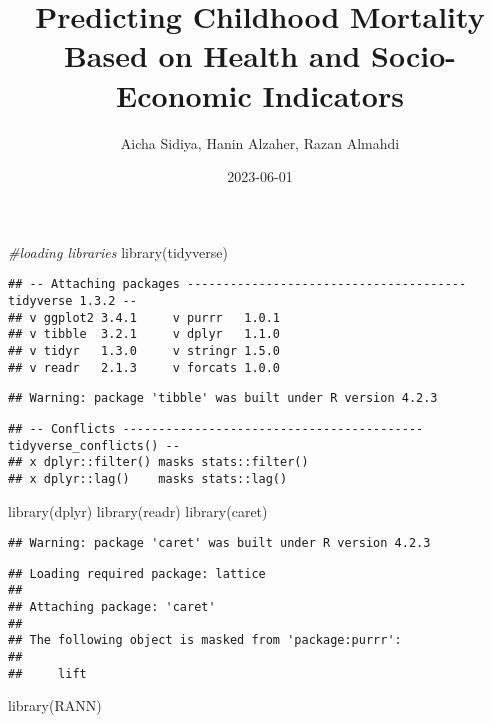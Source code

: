 \documentclass[
]{article}
\title{Predicting Childhood Mortality Based on Health and Socio-Economic
Indicators}
\author{Aicha Sidiya, Hanin Alzaher, Razan Almahdi}
\date{2023-06-01}
\newenvironment{Shaded}{\begin{snugshade}}{\end{snugshade}}
\newcommand{\CommentTok}[1]{\textcolor[rgb]{0.56,0.35,0.01}{\textit{#1}}}
\newcommand{\FunctionTok}[1]{\textcolor[rgb]{0.00,0.00,0.00}{#1}}
\newcommand{\NormalTok}[1]{#1}
\begin{document}
\maketitle

\begin{Shaded}
\begin{Highlighting}[]
\CommentTok{\#loading libraries}
\FunctionTok{library}\NormalTok{(tidyverse)}
\end{Highlighting}
\end{Shaded}

\begin{verbatim}
## -- Attaching packages --------------------------------------- tidyverse 1.3.2 --
## v ggplot2 3.4.1     v purrr   1.0.1
## v tibble  3.2.1     v dplyr   1.1.0
## v tidyr   1.3.0     v stringr 1.5.0
## v readr   2.1.3     v forcats 1.0.0
\end{verbatim}

\begin{verbatim}
## Warning: package 'tibble' was built under R version 4.2.3
\end{verbatim}

\begin{verbatim}
## -- Conflicts ------------------------------------------ tidyverse_conflicts() --
## x dplyr::filter() masks stats::filter()
## x dplyr::lag()    masks stats::lag()
\end{verbatim}

\begin{Shaded}
\begin{Highlighting}[]
\FunctionTok{library}\NormalTok{(dplyr)}
\FunctionTok{library}\NormalTok{(readr)}
\FunctionTok{library}\NormalTok{(caret)}
\end{Highlighting}
\end{Shaded}

\begin{verbatim}
## Warning: package 'caret' was built under R version 4.2.3
\end{verbatim}

\begin{verbatim}
## Loading required package: lattice
## 
## Attaching package: 'caret'
## 
## The following object is masked from 'package:purrr':
## 
##     lift
\end{verbatim}

\begin{Shaded}
\begin{Highlighting}[]
\FunctionTok{library}\NormalTok{(RANN)}
\end{Highlighting}
\end{Shaded}
\end{document}
